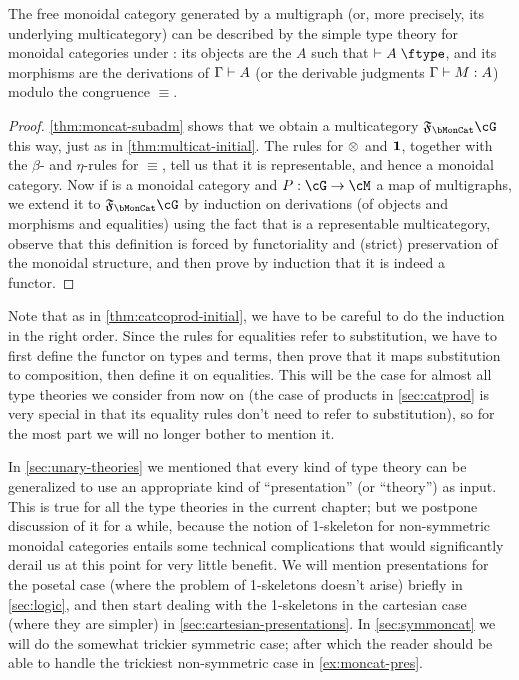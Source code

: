 \begin{thm}\label{thm:moncat-initial}
  The free monoidal category generated by a multigraph \cG (or, more precisely, its underlying multicategory) can be described by the simple type theory for monoidal categories under \cG: its objects are the $A$ such that $\types A\type$, and its morphisms are the derivations of $\Gamma\vdash A$ (or the derivable judgments $\Gamma\vdash M:A$) modulo the congruence $\equiv$.
\end{thm}
\begin{proof}
  \cref{thm:moncat-subadm} shows that we obtain a multicategory $\F\bMonCat\cG$ this way, just as in \cref{thm:multicat-initial}.
  The rules for $\otimes$ and $\mathbf{1}$, together with the $\beta$- and $\eta$-rules for $\equiv$, tell us that it is representable, and hence a monoidal category.
  Now if \cM is a monoidal category and $P:\cG\to\cM$ a map of multigraphs, we extend it to $\F\bMonCat\cG$ by induction on derivations (of objects and morphisms and equalities) using the fact that \cM is a representable multicategory, observe that this definition is forced by functoriality and (strict) preservation of the monoidal structure, and then prove by induction that it is indeed a functor.
\end{proof}

Note that as in \cref{thm:catcoprod-initial}, we have to be careful to do the induction in the right order.
Since the rules for equalities refer to substitution, we have to first define the functor on types and terms, then prove that it maps substitution to composition, then define it on equalities.
This will be the case for almost all type theories we consider from now on (the case of products in \cref{sec:catprod} is very special in that its equality rules don't need to refer to substitution), so for the most part we will no longer bother to mention it.

\begin{rmk}\label{rmk:moncat-pres}
  In \cref{sec:unary-theories} we mentioned that every kind of type theory can be generalized to use an appropriate kind of ``presentation'' (or ``theory'') as input.
  This is true for all the type theories in the current chapter; but we postpone discussion of it for a while, because the notion of 1-skeleton for non-symmetric monoidal categories entails some technical complications that would significantly derail us at this point for very little benefit.
  We will mention presentations for the posetal case (where the problem of 1-skeletons doesn't arise) briefly in \cref{sec:logic}, and then start dealing with the 1-skeletons in the cartesian case (where they are simpler) in \cref{sec:cartesian-presentations}.
  In \cref{sec:symmoncat} we will do the somewhat trickier symmetric case; after which the reader should be able to handle the trickiest non-symmetric case in \cref{ex:moncat-pres}.
\end{rmk}


